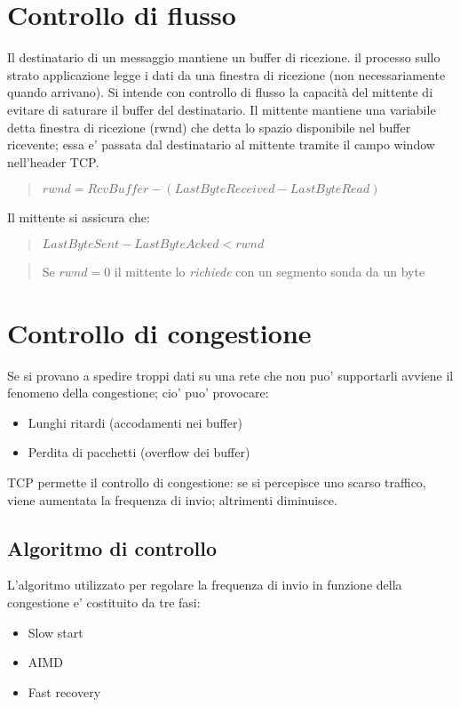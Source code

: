 \section{Controllo di flusso}
Il destinatario di un messaggio mantiene un buffer di ricezione.
il processo sullo strato applicazione legge i dati da una finestra di ricezione (non necessariamente quando arrivano).
Si intende con {\color{blue}controllo di flusso} la capacità del mittente di evitare di saturare il buffer del destinatario.
Il mittente mantiene una variabile detta {\color{blue}finestra di ricezione} (rwnd) che detta lo spazio disponibile nel buffer ricevente; essa e' passata dal destinatario al mittente tramite il campo window nell'header TCP.
\begin{quote}
    $rwnd = RcvBuffer - (LastByteReceived - LastByteRead)$
\end{quote}
\newpage
Il mittente si assicura che:
\begin{quote}
    $LastByteSent - LastByteAcked < rwnd$
\end{quote}
\begin{quote}
    Se $rwnd = 0$ il mittente lo \textit{richiede} con un segmento sonda da un byte
\end{quote}
\section{Controllo di congestione}
Se si provano a spedire troppi dati su una rete che non puo' supportarli avviene il fenomeno della congestione; cio' puo' provocare:
\begin{itemize}
    \item Lunghi ritardi (accodamenti nei buffer)
    \item Perdita di pacchetti (overflow dei buffer)
\end{itemize}
TCP permette il {\color{blue}controllo di congestione}: se si percepisce uno scarso traffico, viene aumentata la frequenza di invio; altrimenti diminuisce.
\subsection{Algoritmo di controllo}
L'algoritmo utilizzato per regolare la frequenza di invio in funzione della congestione e' costituito da tre fasi:
\begin{itemize}
    \item Slow start
    \item AIMD 
    \item Fast recovery
\end{itemize}
